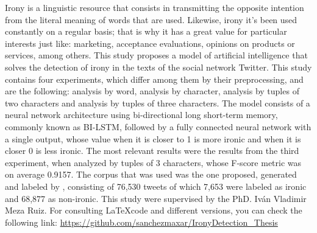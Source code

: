     \par Irony is a linguistic resource that consists in transmitting the opposite intention from the literal meaning of words that are used. Likewise, irony it's been used constantly on a regular basis; that is why it has a great value for particular interests just like: marketing, acceptance evaluations, opinions on products or services, among others. This study proposes a model of artificial intelligence that solves the detection of irony in the texts of the social network Twitter. This study contains four experiments, which differ among them by their preprocessing, and are the following: analysis by word, analysis by character, analysis by tuples of two characters and analysis by tuples of three characters. The model consists of a neural network architecture using bi-directional long short-term memory, commonly known as BI-LSTM, followed by a fully connected neural network with a single output, whose value when it is closer to 1 is more ironic and when it is closer 0 is less ironic. The most relevant results were the results from the third experiment, when analyzed by tuples of 3 characters, whose F-score metric was on average 0.9157. The corpus that was used was the one proposed, generated and labeled by \textcite{lopez2016character}, consisting of 76,530 tweets of which 7,653 were labeled as ironic and 68,877 as non-ironic. This study were supervised by the PhD. Iván Vladimir Meza Ruiz. For consulting \LaTeX code and different versions, you can check the following link: \url{https://github.com/sanchezmaxar/IronyDetection_Thesis}
    
    

